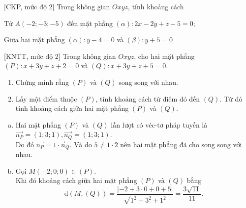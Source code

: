 \begin{bt}%
[CKP, mức độ 2]%
	Trong không gian $Oxyz$, tính khoảng cách
	\begin{listEX}
		\item Từ $ A(-2;-3;-5) $ đến mặt phẳng $ (\alpha) \colon 2x-2y+z-5=0 $;
		\item Giữa hai mặt phẳng $ (\alpha)\colon y-4=0 $ và $ (\beta)\colon y+5=0 $
	\end{listEX}
\end{bt}

\begin{bt}%
[KNTT, mức độ 2]%
	Trong không gian $Oxyz$, cho hai mặt phẳng $(P)\colon x+3y+z+2=0$ và $ (Q)\colon x+3y+z+5=0$.
	\begin{enumerate}
		\item Chứng minh rằng $(P)$ và $(Q)$ song song với nhau.
		\item  Lấy một điểm thuộc $(P)$, tính khoảng cách từ điểm đó đến $(Q)$. Từ đó tính khoảng cách giữa hai mặt phẳng $(P)$ và $(Q)$.
	\end{enumerate}
	\loigiai
	{
		\begin{enumerate}[a)]
			\item Hai mặt phẳng $(P)$ và $(Q)$ lần lượt có véc-tơ pháp tuyến là $\overrightarrow{n_P}=(1;3;1),\overrightarrow{n_Q}=(1;3;1)$.\\
			Do đó $\overrightarrow{n_P}=1 \cdot \overrightarrow{n}_Q$. Và do $5 \ne 1 \cdot 2$ nên hai mặt phẳng đã cho song song với nhau.
			\item Gọi $M(-2;0;0) \in (P)$.\\
			Khi đó khoảng cách giữa hai mặt phẳng $(P)$ và $(Q)$ bằng
			\[ \mathrm{d}(M,(Q)) = \dfrac{|-2+3\cdot0 +0 +5|}{\sqrt{1^2+3^2+1^2}} = \dfrac{3\sqrt{11}}{11}. \]
		\end{enumerate}
	}
\end{bt}

